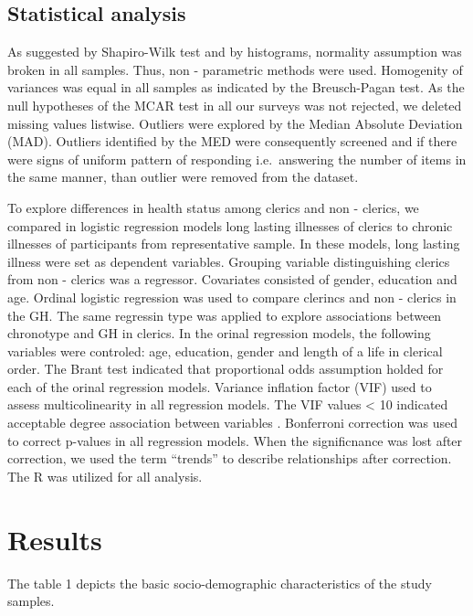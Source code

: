 \documentclass[ijerph,article,accept,moreauthors,pdftex]{mdpi}
\begin{document}
\hypertarget{statistical-analysis}{%
\subsection{Statistical analysis}\label{statistical-analysis}}

As suggested by Shapiro-Wilk test and by histograms, normality
assumption was broken in all samples. Thus, non - parametric methods
were used. Homogenity of variances was equal in all samples as indicated
by the Breusch-Pagan test. As the null hypotheses of the MCAR test in
all our surveys was not rejected, we deleted missing values listwise.
Outliers were explored by the Median Absolute Deviation (MAD). Outliers
identified by the MED were consequently screened and if there were signs
of uniform pattern of responding i.e.~answering the number of items in
the same manner, than outlier were removed from the dataset.

To explore differences in health status among clerics and non - clerics,
we compared in logistic regression models long lasting illnesses of
clerics to chronic illnesses of participants from representative sample.
In these models, long lasting illness were set as dependent variables.
Grouping variable distinguishing clerics from non - clerics was a
regressor. Covariates consisted of gender, education and age. Ordinal
logistic regression was used to compare clerincs and non - clerics in
the GH. The same regressin type was applied to explore associations
between chronotype and GH in clerics. In the orinal regression models,
the following variables were controled: age, education, gender and
length of a life in clerical order. The Brant test indicated that
proportional odds assumption holded for each of the orinal regression
models. Variance inflation factor (VIF) used to assess multicolinearity
in all regression models. The VIF values \textless{} 10 indicated
acceptable degree association between variables \citep{TAY2017}.
Bonferroni correction was used to correct p-values in all regression
models. When the significnance was lost after correction, we used the
term ``trends'' to describe relationships after correction. The R
\citep[Version 4.0.3;][]{R-base} was utilized for all analysis.

\hypertarget{results}{%
\section{Results}\label{results}}

The table 1 depicts the basic socio-demographic characteristics of the
study samples.
\end{document}
